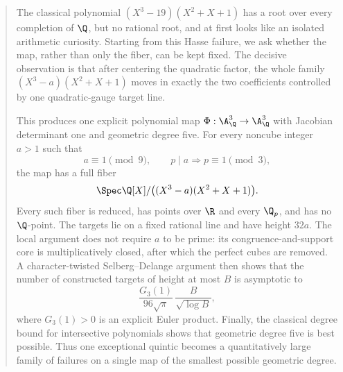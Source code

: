 \begin{abstract}
The classical polynomial
\((X^3-19)(X^2+X+1)\) has a root over every completion of \(\Q\), but no
rational root, and at first looks like an isolated arithmetic curiosity.
Starting from this Hasse failure, we ask whether
the map, rather than only the fiber, can be kept fixed.  The decisive
observation is that after centering the quadratic factor, the whole family
\((X^3-a)(X^2+X+1)\) moves in exactly the two coefficients controlled by
one quadratic-gauge target line.

This produces one explicit polynomial map
\(\Phi:\A^3_{\Q}\to\A^3_{\Q}\) with Jacobian determinant one and geometric
degree five.  For every noncube integer \(a>1\) such that
\[
 a\equiv1\pmod 9,
 \qquad p\mid a\Longrightarrow p\equiv1\pmod3,
\]
the map has a full fiber
\[
 \Spec\Q[X]/\bigl((X^3-a)(X^2+X+1)\bigr).
\]
Every such fiber is reduced, has points over \(\R\) and every \(\Q_p\), and
has no \(\Q\)-point.  The targets lie on a fixed rational line and have
height \(32a\).  The local argument does not require \(a\) to be prime:
its congruence-and-support core is multiplicatively closed, after which
the perfect cubes are removed.  A character-twisted
Selberg--Delange argument then shows that the number of constructed targets
of height at most \(B\) is asymptotic to
\[
 \frac{G_3(1)}{96\sqrt{\pi}}\,
 \frac{B}{\sqrt{\log B}},
\]
where \(G_3(1)>0\) is an explicit Euler product.  Finally, the classical
degree bound for intersective polynomials shows that geometric degree five
is best possible.  Thus one exceptional quintic becomes a quantitatively
large family of failures on a single map of the smallest possible geometric
degree.
\end{abstract}
